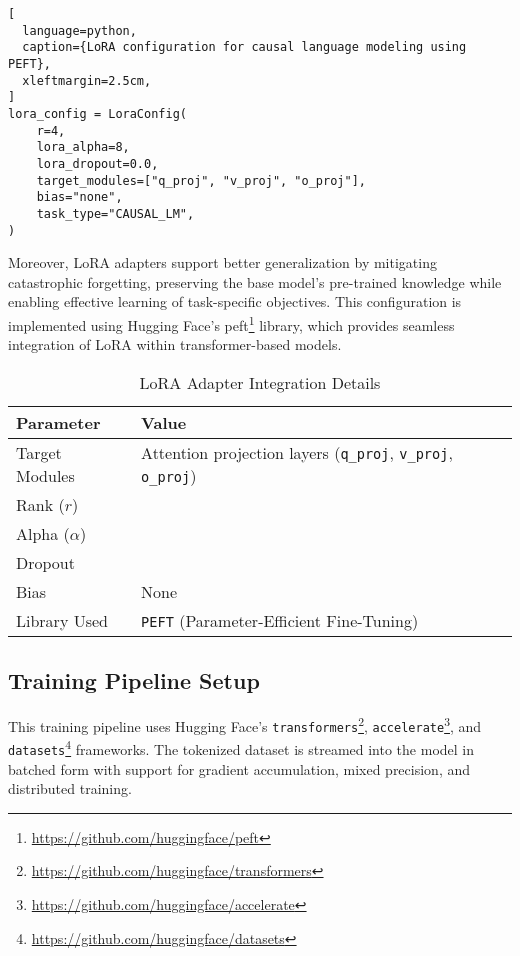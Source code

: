 \begin{lstlisting}[
  language=python,
  caption={LoRA configuration for causal language modeling using PEFT},
  xleftmargin=2.5cm,
]
lora_config = LoraConfig(
    r=4,
    lora_alpha=8,
    lora_dropout=0.0,
    target_modules=["q_proj", "v_proj", "o_proj"],
    bias="none",
    task_type="CAUSAL_LM",
)
\end{lstlisting}

Moreover, LoRA adapters support better generalization by mitigating
catastrophic forgetting, preserving the base model's pre-trained knowledge while
enabling effective learning of task-specific objectives. This configuration is implemented
using Hugging Face's peft\footnote{\url{https://github.com/huggingface/peft}} library, which provides seamless integration of LoRA within
transformer-based models.

\begin{table}[H]
  \centering
  \scriptsize
  \renewcommand{\arraystretch}{1.3}
  \begin{tabularx}{0.95\textwidth}{
    >{\raggedright\arraybackslash}p{5cm}
    >{\centering\arraybackslash}X
  }
    \toprule
    \textbf{Parameter} & \textbf{Value} \\
    \midrule
    Target Modules & Attention projection layers (\texttt{q\_proj}, \texttt{v\_proj}, \texttt{o\_proj}) \\
    Rank ($r$) & 4 \\
    Alpha ($\alpha$) & 8 \\
    Dropout & 0.0 \\
    Bias & None \\
    Library Used & \texttt{PEFT} (Parameter-Efficient Fine-Tuning) \\
    \bottomrule
  \end{tabularx}
  \caption{LoRA Adapter Integration Details}
\end{table}

\subsection{Training Pipeline Setup}

This training pipeline uses Hugging Face's \texttt{transformers}\footnote{\url{https://github.com/huggingface/transformers}}, \texttt{accelerate}\footnote{\url{https://github.com/huggingface/accelerate}}, and \texttt{datasets}\footnote{\url{https://github.com/huggingface/datasets}} frameworks.
The tokenized dataset is streamed into the model in batched form with support for gradient
accumulation, mixed precision, and distributed training.

